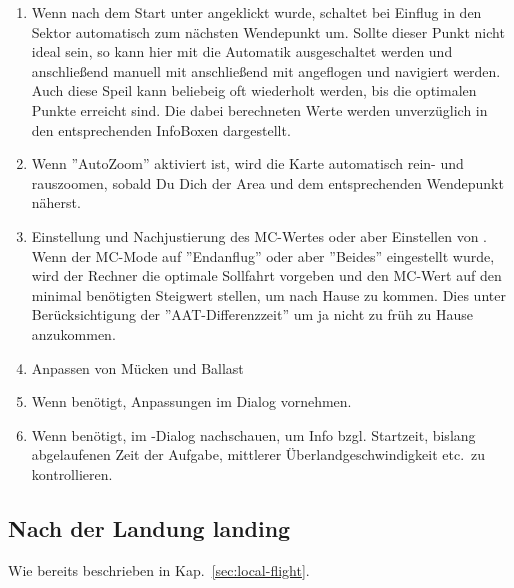 \begin{enumerate}
\begin{center}
\end{center}
\achtung \item  Wenn nach dem Start unter  angeklickt wurde, schaltet \xc bei Einflug in den Sektor
automatisch zum nächsten Wendepunkt um.
Sollte dieser Punkt nicht ideal sein, so kann hier mit   die Automatik ausgeschaltet werden und anschließend
manuell mit anschließend mit  angeflogen und navigiert werden. Auch diese Speil kann beliebeig oft wiederholt werden, bis die optimalen Punkte erreicht sind.
Die dabei berechneten Werte werden unverzüglich in den entsprechenden InfoBoxen dargestellt.
\item Wenn ''AutoZoom'' aktiviert ist, wird die Karte automatisch rein- und rauszoomen, sobald Du Dich der Area und
dem entsprechenden Wendepunkt näherst.
\item  Einstellung und Nachjustierung  des MC-Wertes oder aber Einstellen von  .
Wenn der MC-Mode auf ''Endanflug'' oder aber ''Beides'' eingestellt wurde, wird der Rechner die optimale Sollfahrt vorgeben und den MC-Wert auf
den minimal benötigten Steigwert  stellen, um nach Hause zu kommen.
Dies unter Berücksichtigung der ''AAT-Differenzzeit'' um ja nicht zu früh zu Hause anzukommen.
\item  Anpassen von Mücken und Ballast
\item  Wenn benötigt, Anpassungen im  Dialog vornehmen.
\item  Wenn benötigt, im -Dialog nachschauen, um Info bzgl.  Startzeit,
bislang abgelaufenen Zeit der Aufgabe, mittlerer Überlandgeschwindigkeit etc.\ zu kontrollieren.
\end{enumerate}

\subsection*{Nach der Landung landing}
Wie bereits  beschrieben in Kap.~\ref{sec:local-flight}.
